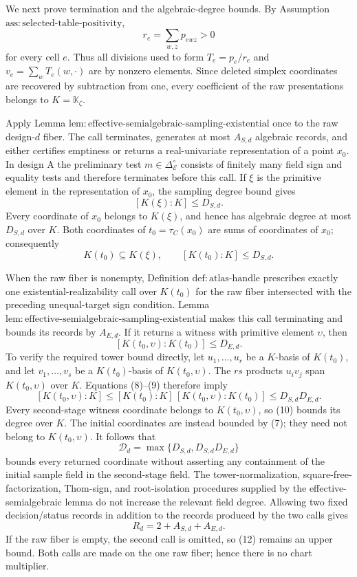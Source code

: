 We next prove termination and the algebraic-degree bounds.  By Assumption \(\mathrm{ass{:}selected\text{-}table\text{-}positivity}\),
\[
r_e=\sum_{w,z}p_{ewz}>0
\]
for every cell \(e\).  Thus all divisions used to form \(T_e=p_e/r_e\) and \(v_e=\sum_wT_e(w,\cdot)\) are by nonzero elements.  Since deleted simplex coordinates are recovered by subtraction from one, every coefficient of the raw presentations belongs to \(K=\mathbb K_{\zeta}\).

Apply Lemma \(\mathrm{lem{:}effective\text{-}semialgebraic\text{-}sampling\text{-}existential}\) once to the raw design-\(d\) fiber.  The call terminates, generates at most \(A_{S,d}\) algebraic records, and either certifies emptiness or returns a real-univariate representation of a point \(x_0\).  In design A the preliminary test \(m\in\Delta_{\mathcal E}^{\circ}\) consists of finitely many field sign and equality tests and therefore terminates before this call.  If \(\xi\) is the primitive element in the representation of \(x_0\), the sampling degree bound gives
\[
[K(\xi):K]\le D_{S,d}.                                      \tag{7}
\]
Every coordinate of \(x_0\) belongs to \(K(\xi)\), and hence has algebraic degree at most \(D_{S,d}\) over \(K\).  Both coordinates of \(t_0=\tau_C(x_0)\) are sums of coordinates of \(x_0\); consequently
\[
K(t_0)\subseteq K(\xi),
\qquad [K(t_0):K]\le D_{S,d}.                              \tag{8}
\]

When the raw fiber is nonempty, Definition \(\mathrm{def{:}atlas\text{-}handle}\) prescribes exactly one existential-realizability call over \(K(t_0)\) for the raw fiber intersected with the preceding unequal-target sign condition.  Lemma \(\mathrm{lem{:}effective\text{-}semialgebraic\text{-}sampling\text{-}existential}\) makes this call terminating and bounds its records by \(A_{E,d}\).  If it returns a witness with primitive element \(\upsilon\), then
\[
[K(t_0,\upsilon):K(t_0)]\le D_{E,d}.                       \tag{9}
\]
To verify the required tower bound directly, let \(u_1,\ldots,u_r\) be a \(K\)-basis of \(K(t_0)\), and let \(v_1,\ldots,v_s\) be a \(K(t_0)\)-basis of \(K(t_0,\upsilon)\).  The \(rs\) products \(u_iv_j\) span \(K(t_0,\upsilon)\) over \(K\).  Equations (8)--(9) therefore imply
\[
[K(t_0,\upsilon):K]
\le [K(t_0):K]\,[K(t_0,\upsilon):K(t_0)]
\le D_{S,d}D_{E,d}.                                      \tag{10}
\]
Every second-stage witness coordinate belongs to \(K(t_0,\upsilon)\), so (10) bounds its degree over \(K\).  The initial coordinates are instead bounded by (7); they need not belong to \(K(t_0,\upsilon)\).  It follows that
\[
\mathcal D_d=\max\{D_{S,d},D_{S,d}D_{E,d}\}              \tag{11}
\]
bounds every returned coordinate without asserting any containment of the initial sample field in the second-stage field.  The tower-normalization, square-free-factorization, Thom-sign, and root-isolation procedures supplied by the effective-semialgebraic lemma do not increase the relevant field degree.  Allowing two fixed decision/status records in addition to the records produced by the two calls gives
\[
R_d=2+A_{S,d}+A_{E,d}.                                    \tag{12}
\]
If the raw fiber is empty, the second call is omitted, so (12) remains an upper bound.  Both calls are made on the one raw fiber; hence there is no chart multiplier.

